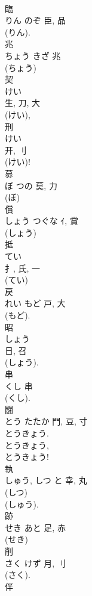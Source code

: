 \documentclass[8pt]{extreport}
\begin{document}
\begin{CJK}{UTF8}{min}
\\	臨	
\\	りん	のぞ	臣, 品		
\\	(りん). 
\\	兆	
\\	ちょう	きざ	兆	
\\	(ちょう) 
\\	契	
\\	けい	
\\	生, 刀, 大	
\\	(けい), 
\\	刑	
\\	けい	
\\	开, 刂	
\\	(けい)! 
\\	募	
\\	ぼ	つの	莫, 力	
\\	(ぼ) 
\\	償	
\\	しょう	つぐな	ｲ, 賞	
\\	(しょう) 
\\	抵	
\\	てい	
\\	扌, 氏, 一	
\\	(てい) 
\\	戻	
\\	れい	もど	戸, 大	
\\	(もど). 
\\	昭	
\\	しょう	
\\	日, 召	
\\	(しょう). 
\\	串	
\\	くし	串	
\\	(くし). 
\\	闘	
\\	とう	たたか	門, 豆, 寸	
\\	とうきょう. 
\\	とうきょう, 
\\	とうきょう!
\\	執	
\\	しゅう, しつ	と	幸, 丸	
\\	(しつ) 
\\	(しゅう). 
\\	跡	
\\	せき	あと	足, 赤	
\\	(せき) 
\\	削	
\\	さく	けず	月, 刂		
\\	(さく).	
\\	伴	

\end{CJK}
\end{document}
